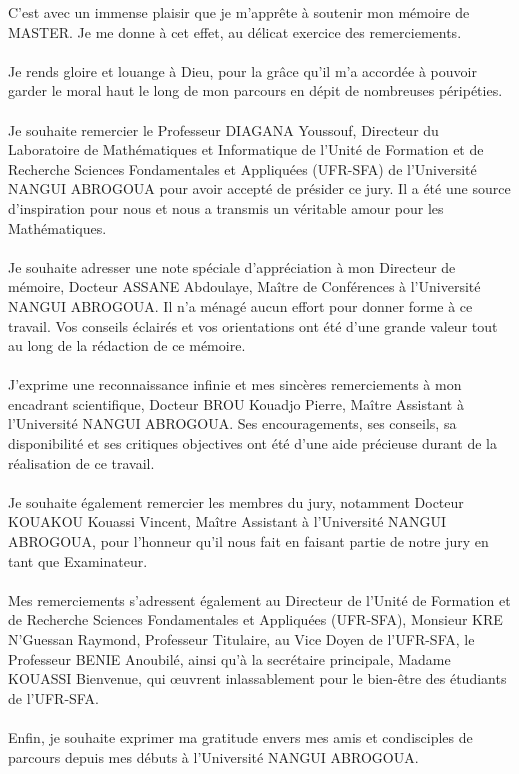 C'est avec un immense plaisir que je m'apprête à soutenir mon mémoire de \\ MASTER. Je me donne à cet effet, au délicat exercice des remerciements.\\\\
Je rends gloire et louange à Dieu, pour la grâce qu'il m'a accordée à pouvoir garder le moral haut le long de mon parcours en dépit de nombreuses péripéties.\\\\
Je souhaite remercier le Professeur DIAGANA Youssouf, Directeur du Laboratoire de Mathématiques et Informatique de l'Unité de Formation et de Recherche Sciences Fondamentales et Appliquées (UFR-SFA) de l'Université NANGUI ABROGOUA pour avoir accepté de présider ce jury. Il a été une source d'inspiration pour nous et nous a transmis un véritable amour pour les Mathématiques.\\\\
Je souhaite adresser une note spéciale d'appréciation à mon Directeur de mémoire, Docteur ASSANE Abdoulaye, Maître de Conférences à l'Université NANGUI ABROGOUA. Il n'a ménagé aucun effort pour donner forme à ce travail. Vos conseils éclairés et vos orientations ont été d'une grande valeur tout au long de la rédaction de ce mémoire.\\\\
J'exprime une reconnaissance infinie et mes sincères remerciements à mon encadrant scientifique, Docteur BROU Kouadjo Pierre, Maître Assistant à l'Université NANGUI ABROGOUA. Ses encouragements, ses conseils, sa disponibilité et ses critiques objectives ont été d'une aide précieuse durant de la réalisation de ce travail.\\\\
Je souhaite également remercier les membres du jury, notamment Docteur KOUAKOU Kouassi Vincent, Maître Assistant à l'Université NANGUI ABROGOUA, pour l'honneur qu'il nous fait en faisant partie de notre jury en tant que Examinateur.\\\\
Mes remerciements s'adressent également au Directeur de l'Unité de Formation et de Recherche Sciences Fondamentales et Appliquées (UFR-SFA), Monsieur KRE N'Guessan Raymond, Professeur Titulaire, au Vice Doyen de l'UFR-SFA, le Professeur BENIE Anoubilé, ainsi qu'à la secrétaire principale, Madame KOUASSI Bienvenue, qui œuvrent inlassablement pour le bien-être des étudiants de l'UFR-SFA.\\\\
Enfin, je souhaite exprimer ma gratitude envers mes amis et condisciples de parcours depuis mes débuts à l'Université NANGUI ABROGOUA.
